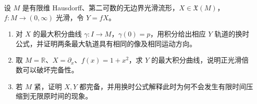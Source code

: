 \begin{exercise}\label{g1:ex:positive-time-change-completeness}
	设 \(M\) 是有限维 Hausdorff、第二可数的无边界光滑流形，\(X\in\mathfrak X(M)\)，\(f:M\to(0,\infty)\) 光滑，令 \(Y=fX\)。
	\begin{enumerate}
		\item 对 \(X\) 的最大积分曲线 \(\gamma:I\to M\)，\(\gamma(0)=p\)，用积分给出相应 \(Y\) 轨道的换时公式，并证明两条最大轨道具有相同的像及相同运动方向。
		\item 取 \(M=\mathbb R\)、\(X=\partial_x\)、\(f(x)=1+x^2\)，求 \(Y\) 的最大积分曲线，说明正光滑倍数可以破坏完备性。
		\item 若 \(M\) 紧，证明 \(X,Y\) 都完备，并用换时公式解释此时为何不会发生有限时间压缩到无限原时间的现象。
	\end{enumerate}
\end{exercise}
